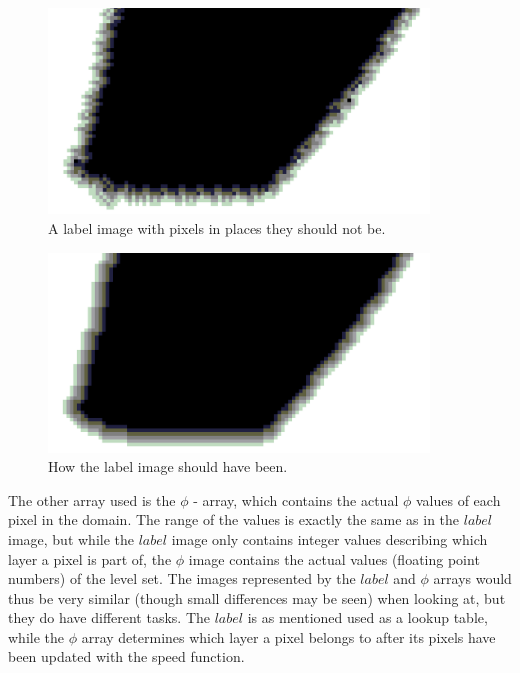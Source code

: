 \begin{figure}[h!]
\centering
\includegraphics[width=0.90\textwidth]{implemented/labelFailedEx}
\caption{A label image with pixels in places they should not be.}
\label{labelFailedEx}
\end{figure}

\begin{figure}[h!]
\centering
\includegraphics[width=0.90\textwidth]{implemented/labelOkEx}
\caption{How the label image should have been.}
\label{labelOkEx}
\end{figure}

The other array used is the $\phi$ - array, which contains the actual $\phi$ values of each pixel in the domain. The range of the values is exactly the same as in the $label$ image, but while the $label$ image only contains integer values describing which layer a pixel is part of, the $\phi$ image contains the actual values (floating point numbers) of the level set. The images represented by the $label$ and $\phi$ arrays would thus be very similar (though small differences may be seen) when looking at, but they do have different tasks. The $label$ is as mentioned used as a lookup table, while the $\phi$ array determines which layer a pixel belongs to after its pixels have been updated with the speed function.


